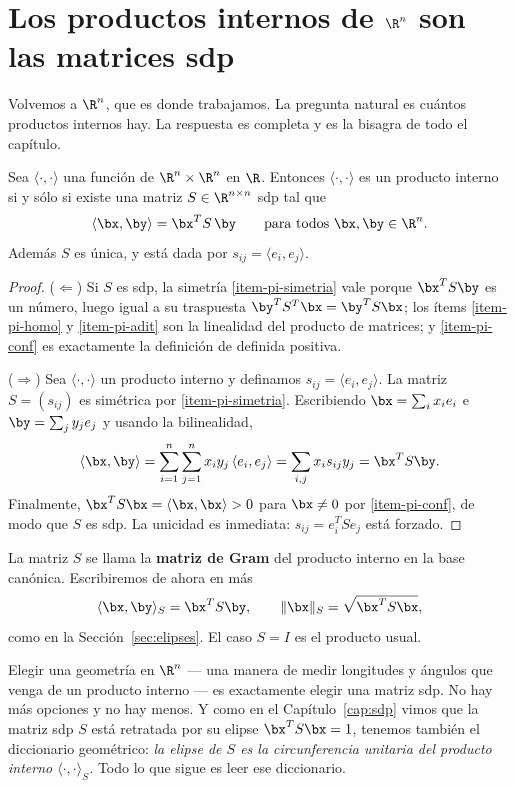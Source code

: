 \section{Los productos internos de $\R^n$ son las matrices sdp}
\label{sec:pi-sdp}

Volvemos a $\R^n$, que es donde trabajamos. La pregunta natural es cuántos
productos internos hay. La respuesta es completa y es la bisagra de todo el
capítulo.

\begin{theorem}\label{teo:pi-son-sdp}
Sea $\langle\cdot,\cdot\rangle$ una función de $\R^n\times\R^n$ en $\R$.
Entonces $\langle\cdot,\cdot\rangle$ es un producto interno si y sólo si
existe una matriz $S\in\R^{n\times n}$ sdp tal que
\[
\langle\bx,\by\rangle=\bx^T S\,\by \qquad\text{para todos }\bx,\by\in\R^n .
\]
Además $S$ es única, y está dada por $s_{ij}=\langle e_i,e_j\rangle$.
\end{theorem}

\begin{proof}
($\Leftarrow$) Si $S$ es sdp, la simetría \ref{item-pi-simetria} vale porque
$\bx^TS\by$ es un número, luego igual a su traspuesta $\by^TS^T\bx=\by^TS\bx$;
los ítems \ref{item-pi-homo} y \ref{item-pi-adit} son la linealidad del
producto de matrices; y \ref{item-pi-conf} es exactamente la definición de
definida positiva.

($\Rightarrow$) Sea $\langle\cdot,\cdot\rangle$ un producto interno y
definamos $s_{ij}=\langle e_i,e_j\rangle$. La matriz $S=(s_{ij})$ es
simétrica por \ref{item-pi-simetria}. Escribiendo
$\bx=\sum_i x_ie_i$ e $\by=\sum_j y_je_j$ y usando la bilinealidad,
\[
\langle\bx,\by\rangle
=\sum_{i=1}^n\sum_{j=1}^n x_iy_j\,\langle e_i,e_j\rangle
=\sum_{i,j} x_i s_{ij} y_j
=\bx^TS\by .
\]
Finalmente, $\bx^TS\bx=\langle\bx,\bx\rangle>0$ para $\bx\neq0$ por
\ref{item-pi-conf}, de modo que $S$ es sdp. La unicidad es inmediata:
$s_{ij}=e_i^TSe_j$ está forzado.
\end{proof}

La matriz $S$ se llama la \textbf{matriz de Gram} del producto interno en la
base canónica. Escribiremos de ahora en más
\[
\langle\bx,\by\rangle_S=\bx^TS\by,
\qquad
\|\bx\|_S=\sqrt{\bx^TS\bx},
\]
como en la Sección~\ref{sec:elipses}. El caso $S=I$ es el producto usual.

\begin{remark}
Elegir una geometría en $\R^n$ --- una manera de medir longitudes y ángulos
que venga de un producto interno --- es exactamente elegir una matriz sdp. No
hay más opciones y no hay menos. Y como en el Capítulo~\ref{cap:sdp} vimos
que la matriz sdp $S$ está retratada por su elipse $\bx^TS\bx=1$, tenemos
también el diccionario geométrico: \emph{la elipse de $S$ es la
circunferencia unitaria del producto interno $\langle\cdot,\cdot\rangle_S$.}
Todo lo que sigue es leer ese diccionario.
\end{remark}

